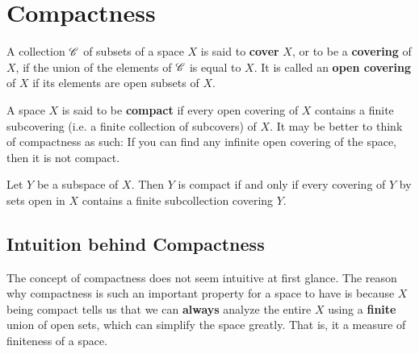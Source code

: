 \section{Compactness}

    \begin{definition}[Covers]
      A collection $\operatorname{\mathscr{C}}$ of subsets of a space $X$ is said to \textbf{cover} $X$, or to be a \textbf{covering} of $X$, if the union of the elements of $\operatorname{\mathscr{C}}$ is equal to $X$. It is called an \textbf{open covering} of $X$ if its elements are open subsets of $X$. 
    \end{definition}

    \begin{definition}[Compactness]
      A space $X$ is said to be \textbf{compact} if every open covering of $X$ contains a finite subcovering (i.e. a finite collection of subcovers) of $X$. It may be better to think of compactness as such: If you can find any infinite open covering of the space, then it is not compact. 
    \end{definition}

    \begin{lemma}
      Let $Y$ be a subspace of $X$. Then $Y$ is compact if and only if every covering of $Y$ by sets open in $X$ contains a finite subcollection covering $Y$. 
    \end{lemma}

  \subsection{Intuition behind Compactness}

    The concept of compactness does not seem intuitive at first glance. The reason why compactness is such an important property for a space to have is because $X$ being compact tells us that we can \textbf{always} analyze the entire $X$ using a \textbf{finite} union of open sets, which can simplify the space greatly. That is, it a measure of finiteness of a space. 

